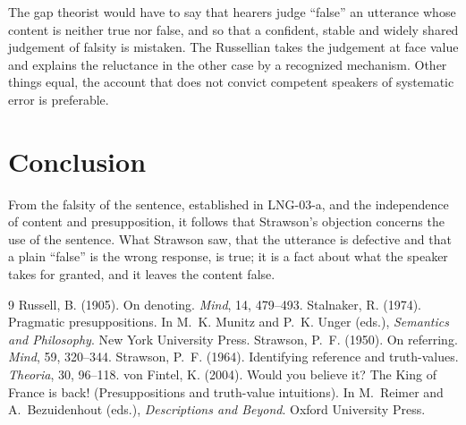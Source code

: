 \documentclass{situationist-preprint}
\begin{document}
\begin{reply}
The gap theorist would have to say that hearers judge \enquote{false} an utterance whose content is neither true nor false, and so that a confident, stable and widely shared judgement of falsity is mistaken. The Russellian takes the judgement at face value and explains the reluctance in the other case by a recognized mechanism. Other things equal, the account that does not convict competent speakers of systematic error is preferable.
\end{reply}

\section{Conclusion}

From the falsity of the sentence, established in LNG-03-a, and the independence of content and presupposition, it follows that Strawson's objection concerns the use of the sentence. What Strawson saw, that the utterance is defective and that a plain \enquote{false} is the wrong response, is true; it is a fact about what the speaker takes for granted, and it leaves the content false.

\begin{thebibliography}{9}\small
{} Russell, B. (1905). On denoting. \emph{Mind}, 14, 479--493.
 Stalnaker, R. (1974). Pragmatic presuppositions. In M.~K. Munitz and P.~K. Unger (eds.), \emph{Semantics and Philosophy}. New York University Press.
 Strawson, P.~F. (1950). On referring. \emph{Mind}, 59, 320--344.
 Strawson, P.~F. (1964). Identifying reference and truth-values. \emph{Theoria}, 30, 96--118.
 von Fintel, K. (2004). Would you believe it? The King of France is back! (Presuppositions and truth-value intuitions). In M.~Reimer and A.~Bezuidenhout (eds.), \emph{Descriptions and Beyond}. Oxford University Press.
\end{thebibliography}
\end{document}
